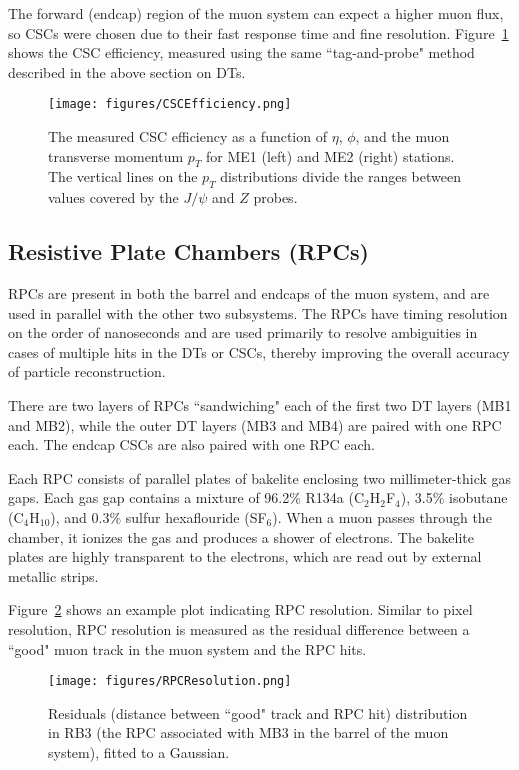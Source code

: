 The forward (endcap) region of the muon system can expect a higher muon flux, so CSCs were chosen due to their fast response time and fine resolution. Figure~\ref{fig:CSCEfficiency} shows the CSC efficiency, measured using the same ``tag-and-probe" method described in the above section on DTs.

\begin{figure}\centering
  \texttt{[image: figures/CSCEfficiency.png]}
  \caption{\label{fig:CSCEfficiency} The measured CSC efficiency as a function of $\eta$, $\phi$, and the muon transverse momentum $p_T$ for ME1 (left) and ME2 (right) stations. The vertical lines on the $p_T$ distributions divide the ranges between values covered by the $J/\psi$ and $Z$ probes.}
\end{figure}

\subsection{Resistive Plate Chambers (RPCs)}

RPCs are present in both the barrel and endcaps of the muon system, and are used in parallel with the other two subsystems. The RPCs have timing resolution on the order of nanoseconds and are used primarily to resolve ambiguities in cases of multiple hits in the DTs or CSCs, thereby improving the overall accuracy of particle reconstruction.

There are two layers of RPCs ``sandwiching" each of the first two DT layers (MB1 and MB2), while the outer DT layers (MB3 and MB4) are paired with one RPC each. The endcap CSCs are also paired with one RPC each. 

Each RPC consists of parallel plates of bakelite enclosing two millimeter-thick gas gaps. Each gas gap contains a mixture of 96.2\% R134a (C$_2$H$_2$F$_4$), 3.5\% isobutane (C$_4$H$_10$), and 0.3\% sulfur hexaflouride (SF$_6$). When a muon passes through the chamber, it ionizes the gas and produces a shower of electrons. The bakelite plates are highly transparent to the electrons, which are read out by external metallic strips.

Figure~\ref{fig:RPCResolution} shows an example plot indicating RPC resolution. Similar to pixel resolution, RPC resolution is measured as the residual difference between a ``good" muon track in the muon system and the RPC hits\cite{Muon}.

\begin{figure}\centering
  \texttt{[image: figures/RPCResolution.png]}
  \caption{\label{fig:RPCResolution} Residuals (distance between ``good" track and RPC hit) distribution in RB3 (the RPC associated with MB3 in the barrel of the muon system), fitted to a Gaussian.}
\end{figure}


